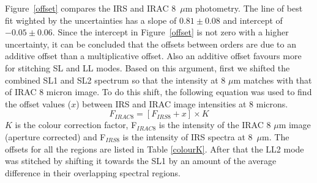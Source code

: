 %
Figure~\ref{offset} compares the IRS and IRAC 8~$\mu$m photometry. The line of best fit wighted by the uncertainties has a slope of $0.81\pm0.08$ 
and intercept of $-0.05\pm0.06$.  Since the intercept in Figure~\ref{offset} is not zero with a higher uncertainty, it can be concluded that the offsets 
between orders are due to an additive offset than a multiplicative offset. Also an additive offset favours more for stitching SL and LL modes. 
Based on this argument, first we shifted the combined SL1 and SL2 spectrum so that the intensity at 8 $\mu$m matches with that of IRAC 8 micron image. 
To do this shift, the following equation was used to find the offset values ($x$) between IRS and IRAC image intensities at 8 microns. 
\begin{equation}
F_{IRAC8} = [ F_{IRS8} + x ] \times K
\end{equation}
\footnotesize
\normalsize
$K$ is the colour correction factor, F$_{IRAC8}$ is the intensity of the IRAC 8 $\mu$m image (aperture corrected) and F$_{IRS8}$ is the intensity of IRS spectra at 8~$\mu$m. 
The offsets for all the regions are listed in Table \ref{colourK}. After that the LL2 mode was stitched by shifting it towards the SL1 by an amount of the average difference in their overlapping spectral regions.	
%

